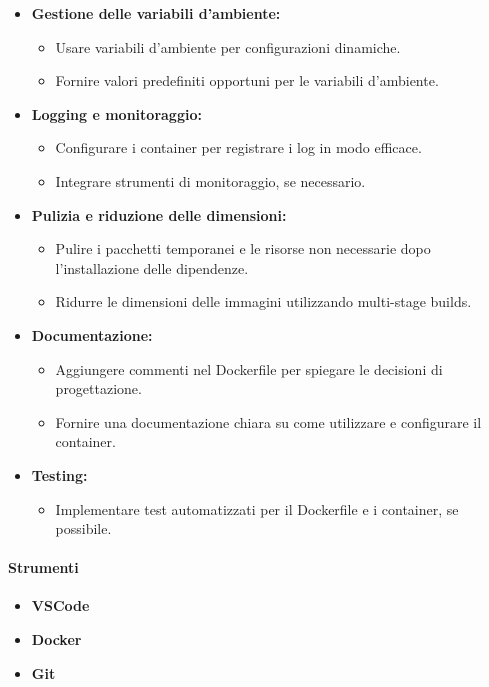 \documentclass{article}
\begin{document}
\begin{itemize}
\item \textbf{Gestione delle variabili d'ambiente:}
    \begin{itemize}
        \item Usare variabili d'ambiente per configurazioni dinamiche.
        \item Fornire valori predefiniti opportuni per le variabili d'ambiente.
    \end{itemize}

\item \textbf{Logging e monitoraggio:}
    \begin{itemize}
        \item Configurare i container per registrare i log in modo efficace.
        \item Integrare strumenti di monitoraggio, se necessario.
    \end{itemize}

\item \textbf{Pulizia e riduzione delle dimensioni:}
    \begin{itemize}
        \item Pulire i pacchetti temporanei e le risorse non necessarie dopo l'installazione delle dipendenze.
        \item Ridurre le dimensioni delle immagini utilizzando multi-stage builds.
    \end{itemize}

\item \textbf{Documentazione:}
    \begin{itemize}
        \item Aggiungere commenti nel Dockerfile per spiegare le decisioni di progettazione.
        \item Fornire una documentazione chiara su come utilizzare e configurare il container.
    \end{itemize}

\item \textbf{Testing:}
    \begin{itemize}
        \item Implementare test automatizzati per il Dockerfile e i container, se possibile.
    \end{itemize}
\end{itemize}
\paragraph{Strumenti}
\begin{itemize}
    \item \textbf{VSCode}
    \item \textbf{Docker}
    \item \textbf{Git}
\end{itemize}
\end{document}
